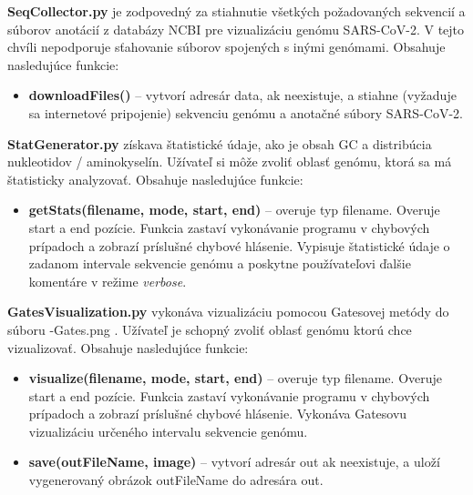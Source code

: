 \textbf{\selectfont SeqCollector.py} je zodpovedný za stiahnutie všetkých požadovaných sekvencií a súborov anotácií z databázy NCBI pre vizualizáciu genómu SARS-CoV-2.
V tejto chvíli nepodporuje sťahovanie súborov spojených s inými genómami.
Obsahuje nasledujúce funkcie:
\begin{itemize}
  \item \textbf{\selectfont downloadFiles()} -- vytvorí adresár {\selectfont data}, ak neexistuje, a stiahne (vyžaduje sa internetové pripojenie) sekvenciu genómu a anotačné súbory SARS-CoV-2.
\end{itemize}



\textbf{\selectfont StatGenerator.py} získava štatistické údaje, ako je obsah GC a distribúcia nukleotidov / aminokyselín.
Užívateľ si môže zvoliť oblasť genómu, ktorá sa má štatisticky analyzovať.
Obsahuje nasledujúce funkcie:
\begin{itemize}
  \item \textbf{\selectfont getStats(filename, mode, start, end)} -- overuje typ {\selectfont filename}. Overuje {\selectfont start} a {\selectfont end} pozície. Funkcia zastaví vykonávanie programu v chybových prípadoch a zobrazí príslušné chybové hlásenie. Vypisuje štatistické údaje o zadanom intervale sekvencie genómu a poskytne používateľovi ďalšie komentáre v režime \textit{verbose}.
\end{itemize}



\textbf{\selectfont GatesVisualization.py} vykonáva vizualizáciu pomocou Gatesovej metódy do súboru {\selectfont -Gates.png} .
Užívateľ je schopný zvoliť oblasť genómu ktorú chce vizualizovať.
Obsahuje nasledujúce funkcie:
\begin{itemize}
  \item \textbf{\selectfont visualize(filename, mode, start, end)} -- overuje typ {\selectfont filename}. Overuje {\selectfont start} a {\selectfont end} pozície. Funkcia zastaví vykonávanie programu v chybových prípadoch a zobrazí príslušné chybové hlásenie. Vykonáva Gatesovu vizualizáciu určeného intervalu sekvencie genómu.
  \item \textbf{\selectfont save(outFileName, image)} -- vytvorí adresár {\selectfont out} ak neexistuje, a uloží vygenerovaný obrázok {\selectfont outFileName} do adresára {\selectfont out}.
\end{itemize}



